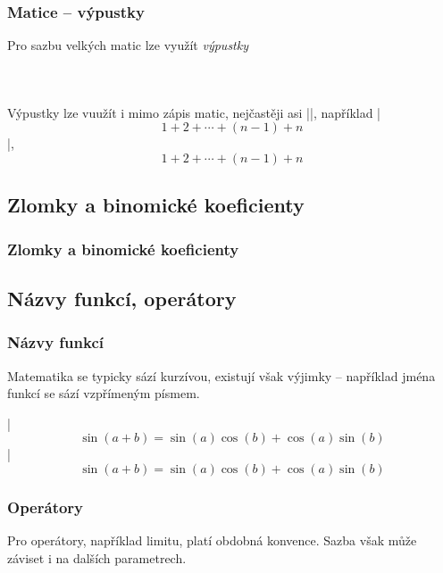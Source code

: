 \begin{frame}[fragile]
	\frametitle{Matice -- výpustky}
	Pro sazbu velkých matic lze využít \emph{výpustky}\par\bigskip
	\begin{columns}
		\begin{column}{0.4\textwidth}
			\begin{displaymath}
				
			\end{displaymath}
		\end{column}
		\begin{column}{0.6\textwidth}
		\end{column}
	\end{columns}
	\begin{remark}
		Výpustky lze vuužít i mimo zápis matic, nejčastěji asi |\cdots|, například |$$1 + 2 + \cdots + (n-1) + n$$|, $$1 + 2 + \cdots + (n-1) + n$$
	\end{remark}
\end{frame}


\subsection{Zlomky a binomické koeficienty}
\begin{frame}
	\frametitle{Zlomky a binomické koeficienty}
\end{frame}


\subsection{Názvy funkcí, operátory}
\begin{frame}[fragile]
	\frametitle{Názvy funkcí}
	Matematika se typicky sází kurzívou, existují však výjimky -- například jména funkcí se sází vzpřímeným písmem.\par
	|$$\sin(a + b) = \sin(a)\cos(b) + \cos(a)\sin(b)$$|
	$$\sin(a + b) = \sin(a)\cos(b) + \cos(a)\sin(b)$$
\end{frame}


\begin{frame}[fragile]
	\frametitle{Operátory}
	Pro operátory, například limitu, platí obdobná konvence. Sazba však může záviset i na dalších parametrech.
	\par\bigskip
	\par\bigskip
	
\end{frame}


